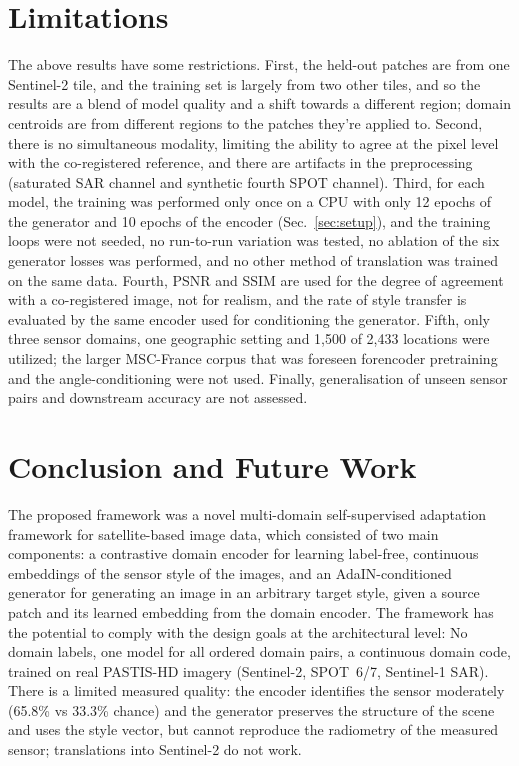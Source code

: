 \documentclass[conference]{IEEEtran}
\begin{document}
\section{Limitations}
\label{sec:limitations}
The above results have some restrictions. First, the held-out patches are from one Sentinel-2 tile, and the training set is largely from two other tiles, and so the results are a blend of model quality and a shift towards a different region; domain centroids are from different regions to the patches they're applied to. Second, there is no simultaneous modality, limiting the ability to agree at the pixel level with the co-registered reference, and there are artifacts in the preprocessing (saturated SAR channel and synthetic fourth SPOT channel). Third, for each model, the training was performed only once on a CPU with only 12 epochs of the generator and 10 epochs of the encoder (Sec.~\ref{sec:setup}), and the training loops were not seeded, no run-to-run variation was tested, no ablation of the six generator losses was performed, and no other method of translation was trained on the same data. Fourth, PSNR and SSIM are used for the degree of agreement with a co-registered image, not for realism, and the rate of style transfer is evaluated by the same encoder used for conditioning the generator. Fifth, only three sensor domains, one geographic setting and 1,500 of 2,433 locations were utilized; the larger MSC-France corpus that was foreseen forencoder pretraining and the angle-conditioning were not used. Finally, generalisation of unseen sensor pairs and downstream accuracy are not assessed.

\section{Conclusion and Future Work}
The proposed framework was a novel multi-domain self-supervised adaptation framework for satellite-based image data, which consisted of two main components: a contrastive domain encoder for learning label-free, continuous embeddings of the sensor style of the images, and an AdaIN-conditioned generator for generating an image in an arbitrary target style, given a source patch and its learned embedding from the domain encoder. The framework has the potential to comply with the design goals at the architectural level: No domain labels, one model for all ordered domain pairs, a continuous domain code, trained on real PASTIS-HD imagery (Sentinel-2, SPOT~6/7, Sentinel-1 SAR). There is a limited measured quality: the encoder identifies the sensor moderately (65.8\% vs 33.3\% chance) and the generator preserves the structure of the scene and uses the style vector, but cannot reproduce the radiometry of the measured sensor; translations into Sentinel-2 do not work.
\end{document}

